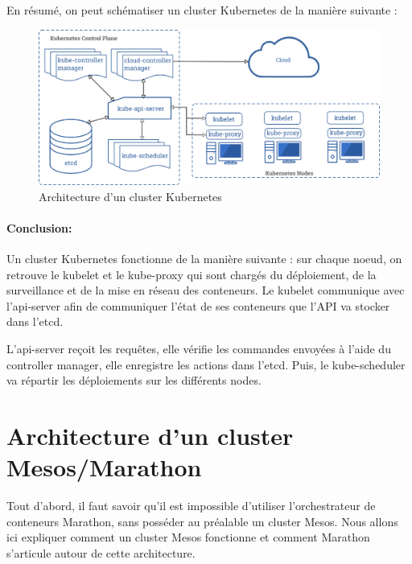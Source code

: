\documentclass[11pt,fleqn]{book} %
\begin{document}
En résumé, on peut schématiser un cluster Kubernetes de la manière suivante :

\begin{figure}[H]\centering
\renewcommand{\figurename}{Schéma}
\includegraphics[scale=0.1]{Pictures/Comparaison/Kubernetes-cluster-archi.png}
\captionsetup{margin=1.5cm,format=hang,justification=justified}
\caption[]{Architecture d'un cluster Kubernetes \newline}
\end{figure}



\begin{interrupt}
\paragraph{Conclusion:}
Un cluster Kubernetes fonctionne de la manière suivante :
sur chaque noeud, on retrouve le kubelet et le kube-proxy qui sont chargés du déploiement, de la surveillance et de la mise en réseau des conteneurs. Le kubelet communique avec l'api-server afin de communiquer l'état de ses conteneurs que l'API va stocker dans l'etcd.\newline

L'api-server reçoit les requêtes, elle vérifie les commandes envoyées à l'aide du controller manager, elle enregistre les actions dans l'etcd. Puis, le kube-scheduler va répartir les déploiements sur les différents nodes.
\end{interrupt}

\section*{Architecture d'un cluster Mesos/Marathon}
Tout d'abord, il faut savoir qu'il est impossible d'utiliser l'orchestrateur de conteneurs Marathon, sans posséder au préalable un cluster Mesos. Nous allons ici expliquer comment un cluster Mesos fonctionne et comment Marathon s'articule autour de cette architecture.
\end{document}
